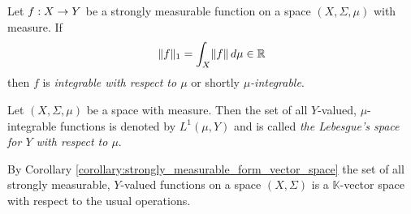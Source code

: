 \begin{definition}
Let $f:X\rightarrow Y$ be a strongly measurable function on a space $(X,\Sigma,\mu)$ with measure. If
$$\lVert f\rVert_1 = \int_X\lVert f\rVert\,d\mu \in {\mathbb R}$$
then $f$ is \textit{integrable with respect to $\mu$} or shortly \textit{$\mu$-integrable}.
\end{definition}

\begin{definition}
Let $(X,\Sigma,\mu)$ be a space with measure. Then the set of all $Y$-valued, $\mu$-integrable functions is denoted by $L^1(\mu,Y)$ and is called \textit{the Lebesgue's space for $Y$ with respect to $\mu$}.
\end{definition}
\noindent
By Corollary \ref{corollary:strongly_measurable_form_vector_space} the set of all strongly measurable, $Y$-valued functions on a space $(X,\Sigma)$ is a $\mathbb{K}$-vector space with respect to the usual operations.

